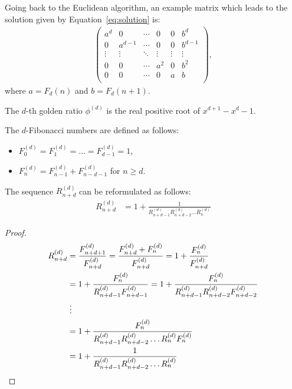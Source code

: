 \documentclass[english,version-2020-11]{uzl-thesis}
\begin{document}
Going back to the Euclidean algorithm,
an example matrix which leads to the solution given by Equation~\ref{eq:solution} is:
\begin{align*}
  \left(\begin{array}{ccccc|c}
    a^d    & 0       & \cdots & 0      & 0      & b^d     \\
    0      & a^{d-1} & \cdots & 0      & 0      & b^{d-1} \\
    \vdots & \vdots  & \ddots & \vdots & \vdots & \vdots  \\
    0      & 0       & \cdots & a^2    & 0      & b^2     \\
    0      & 0       & \cdots & 0      & a      & b       \\
  \end{array}\right),
\end{align*}
where $a = F_d(n)$ and $b = F_d(n + 1)$.

\begin{definition}
  The $d$-th golden ratio $\phi^{(d)}$ is the real positive root of $x^{d+1} - x^d - 1$.
\end{definition}

\begin{definition}
  The $d$-Fibonacci numbers are defined as follows:
  \begin{itemize}
    \item $F^{(d)}_0 = F^{(d)}_1 = \dots = F^{(d)}_{d-1} = 1$,
    \item $F^{(d)}_{n} = F^{(d)}_{n-1} + F^{(d)}_{n-d-1}$ for $n \ge d$.
  \end{itemize}
\end{definition}

\begin{lemma}
  The sequence $R^{(d)}_{n+d}$ can be reformulated as follows:
  \begin{align*}
    R^{(d)}_{n+d}
    & = 1 + \frac{1}{R^{(d)}_{n+d-1} R^{(d)}_{n+d-2} \dots R^{(d)}_n}
  \end{align*}
\end{lemma}

\begin{proof}
  \begin{align*}
    R^{(d)}_{n+d}
    & = \frac{F^{(d)}_{n+d+1}}{F^{(d)}_{n+d}}
    = \frac{F^{(d)}_{n+d} + F^{(d)}_{n}}{F^{(d)}_{n+d}}
    = 1 + \frac{F^{(d)}_{n}}{F^{(d)}_{n+d}} \\
    & = 1 + \frac{F^{(d)}_{n}}{R^{(d)}_{n+d-1} F^{(d)}_{n+d-1}}
    = 1 + \frac{F^{(d)}_{n}}{R^{(d)}_{n+d-1} R^{(d)}_{n+d-2} F^{(d)}_{n+d-2}} \\
    & \mathrel{\vdots} \\
    & = 1 + \frac{F^{(d)}_{n}}{R^{(d)}_{n+d-1} R^{(d)}_{n+d-2} \dots R^{(d)}_n F^{(d)}_n} \\
    & = 1 + \frac{1}{R^{(d)}_{n+d-1} R^{(d)}_{n+d-2} \dots R^{(d)}_n}
    \qedhere
  \end{align*}
\end{proof}
\end{document}
